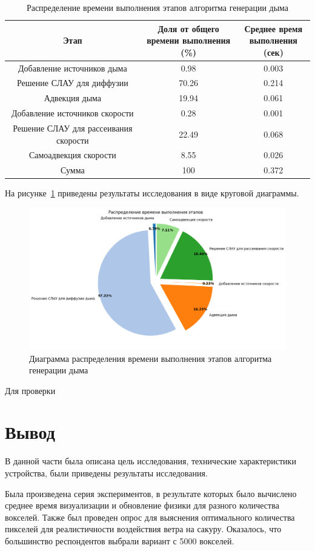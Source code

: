 \begin{table}[H]
	\caption{Распределение времени выполнения этапов алгоритма генерации дыма}
	\label{tab:no_parallel}
	\centering
	\begin{tabular}{|c|c|c|}
		\hline
		Этап&\shortstack{Доля от общего\\времени выполнения (\%)}&\shortstack{Среднее время\\ выполнения (сек)}\\\hline
		Добавление источников дыма&0.98&0.003\\\hline
		Решение СЛАУ для диффузии &70.26&0.214\\\hline
		Адвекция дыма&19.94&0.061\\\hline
		Добавление источников скорости&0.28&0.001\\\hline
		Решение СЛАУ для рассеивания скорости&22.49&0.068\\\hline
		Самоадвекция скорости&8.55&0.026\\\hline\hline
		Сумма&100&	0.372\\\hline
	\end{tabular}
\end{table}

На рисунке~\ref{fig:no_parallel} приведены результаты исследования в виде круговой диаграммы.

\begin{figure}[H]
	\centering
	\includegraphics[width=1.0\textwidth,page=1]{assets/img/pie.png}
	\caption{Диаграмма распределения времени выполнения этапов алгоритма генерации дыма}
	\label{fig:no_parallel}
\end{figure}

Для проверки 

\section*{Вывод}
В данной части была описана цель исследования, технические характеристики устройства, были приведены результаты исследования.

Была произведена серия экспериментов, в результате которых было вычислено среднее время визуализации и обновление физики для разного количества вокселей. Также был проведен опрос для выяснения оптимального количества пикселей для реалистичности воздействия ветра на сакуру. Оказалось, что большинство респондентов выбрали вариант с 5000 вокселей.
